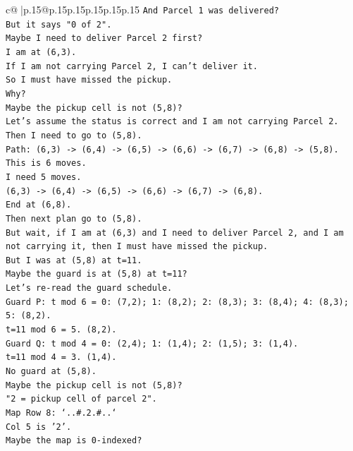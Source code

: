 \documentclass{article}
\begin{document}
{\begin{supertabular}{c@{$\;$}|p{.15\linewidth}@{}p{.15\linewidth}p{.15\linewidth}p{.15\linewidth}p{.15\linewidth}p{.15\linewidth}}
{{{\texttt{And Parcel 1 was delivered?} \\
\texttt{But it says "0 of 2".} \\
\texttt{Maybe I need to deliver Parcel 2 first?} \\
\texttt{I am at (6,3).} \\
\texttt{If I am not carrying Parcel 2, I can't deliver it.} \\
\texttt{So I must have missed the pickup.} \\
\texttt{Why?} \\
\texttt{Maybe the pickup cell is not (5,8)?} \\
\texttt{Let's assume the status is correct and I am not carrying Parcel 2.} \\
\texttt{Then I need to go to (5,8).} \\
\texttt{Path: (6,3) {-}> (6,4) {-}> (6,5) {-}> (6,6) {-}> (6,7) {-}> (6,8) {-}> (5,8).} \\
\texttt{This is 6 moves.} \\
\texttt{I need 5 moves.} \\
\texttt{(6,3) {-}> (6,4) {-}> (6,5) {-}> (6,6) {-}> (6,7) {-}> (6,8).} \\
\texttt{End at (6,8).} \\
\texttt{Then next plan go to (5,8).} \\
\texttt{But wait, if I am at (6,3) and I need to deliver Parcel 2, and I am not carrying it, then I must have missed the pickup.} \\
\texttt{But I was at (5,8) at t=11.} \\
\texttt{Maybe the guard is at (5,8) at t=11?} \\
\texttt{Let's re{-}read the guard schedule.} \\
\texttt{Guard P: t mod 6 = 0: (7,2); 1: (8,2); 2: (8,3); 3: (8,4); 4: (8,3); 5: (8,2).} \\
\texttt{t=11 mod 6 = 5. (8,2).} \\
\texttt{Guard Q: t mod 4 = 0: (2,4); 1: (1,4); 2: (1,5); 3: (1,4).} \\
\texttt{t=11 mod 4 = 3. (1,4).} \\
\texttt{No guard at (5,8).} \\
\texttt{Maybe the pickup cell is not (5,8)?} \\
\texttt{"2 = pickup cell of parcel 2".} \\
\texttt{Map Row 8: `..\#.2.\#..`} \\
\texttt{Col 5 is '2'.} \\
\texttt{Maybe the map is 0{-}indexed?} \\
}}}
\end{supertabular}}
\end{document}
